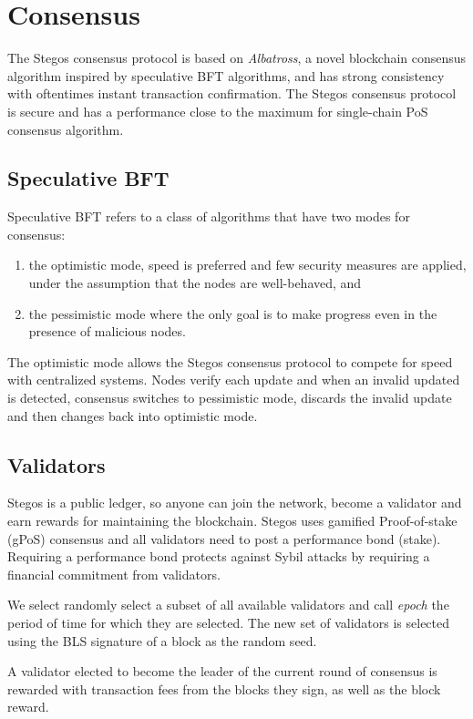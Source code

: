 \documentclass[8pt,fleqn,openany]{book}
\begin{document}
\section{Consensus}
The Stegos consensus protocol is based on \textit{Albatross}\cite{c23}, a novel blockchain consensus algorithm inspired by speculative BFT\cite{c9} algorithms, and has strong consistency with oftentimes instant transaction confirmation. The Stegos consensus protocol is secure and has a performance close to the maximum for single-chain PoS consensus algorithm.

\subsection{Speculative BFT}
Speculative BFT refers to a class of algorithms that have two modes for consensus: 

\begin{enumerate}
	\item the optimistic mode, speed is preferred and few security measures are applied, under the assumption that the nodes are well-behaved, and
	\item the pessimistic mode where the only goal is to make progress even in the presence of malicious nodes.
\end{enumerate}

The optimistic mode allows the Stegos consensus protocol to compete for speed with centralized systems. Nodes verify each update and when an invalid updated is detected, consensus switches to pessimistic mode, discards the invalid update and then changes back into optimistic mode.

\subsection{Validators}
Stegos is a public ledger, so anyone can join the network, become a validator and earn rewards for maintaining the blockchain. Stegos uses gamified Proof-of-stake (gPoS) consensus and all validators need to post a performance bond (stake). Requiring a performance bond protects against Sybil attacks by requiring a financial commitment from validators.

We select randomly select a subset of all available validators and call \textit{epoch} the period of time for which they are selected. The new set of validators is selected using the BLS signature of a block as the random seed.

A validator elected to become the leader of the current round of consensus is rewarded with transaction fees from the blocks they sign, as well as the block reward. 
\end{document}
